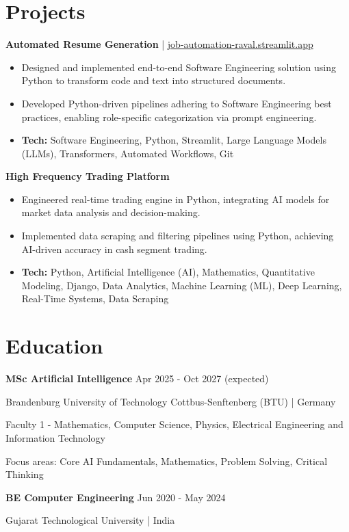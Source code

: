 \documentclass[a4paper,10pt]{article}
\begin{document}
\section*{Projects}
\textbf{Automated Resume Generation} | \href{https://job-automation-raval.streamlit.app/}{job-automation-raval.streamlit.app}\par
\begin{itemize}
\item Designed and implemented end-to-end Software Engineering solution using Python to transform code and text into structured documents.
\item Developed Python-driven pipelines adhering to Software Engineering best practices, enabling role-specific categorization via prompt engineering.
\item \textbf{Tech:} Software Engineering, Python, Streamlit, Large Language Models (LLMs), Transformers, Automated Workflows, Git
\end{itemize}
\vspace{3pt}
\textbf{High Frequency Trading Platform}\par
\begin{itemize}
\item Engineered real-time trading engine in Python, integrating AI models for market data analysis and decision-making.
\item Implemented data scraping and filtering pipelines using Python, achieving AI-driven accuracy in cash segment trading.
\item \textbf{Tech:} Python, Artificial Intelligence (AI), Mathematics, Quantitative Modeling, Django, Data Analytics, Machine Learning (ML), Deep Learning, Real-Time Systems, Data Scraping
\end{itemize}
\vspace{3pt}

\section*{Education}
\textbf{MSc Artificial Intelligence} \hfill Apr 2025 - Oct 2027 (expected)\par
Brandenburg University of Technology Cottbus-Senftenberg (BTU) | Germany\par
Faculty 1 - Mathematics, Computer Science, Physics, Electrical Engineering and Information Technology\par
Focus areas: Core AI Fundamentals, Mathematics, Problem Solving, Critical Thinking\par
\vspace{3pt}
\textbf{BE Computer Engineering} \hfill Jun 2020 - May 2024\par
Gujarat Technological University | India\par
\vspace{3pt}
\end{document}
